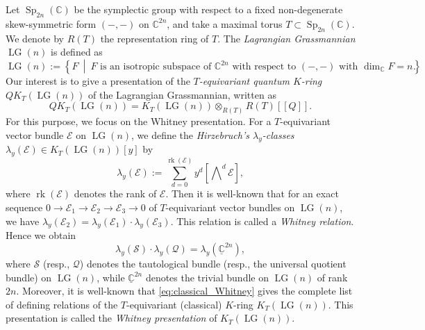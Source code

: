 \documentclass[a4paper, 11pt, reqno]{amsart}
\numberwithin{equation}{section}
\newcommand{\BC}{\mathbb{C}}
\newcommand{\udBC}{\underline{\BC}}
\newcommand{\CE}{\mathcal{E}}
\newcommand{\CQ}{\mathcal{Q}}
\newcommand{\CS}{\mathcal{S}}
\newcommand{\Sp}[1]{\operatorname{Sp}_{#1}(\BC)}
\newcommand{\LG}{\operatorname{LG}}
\newcommand{\bra}[1]{[\![ #1 ]\!]}
\newcommand{\class}[1]{\left[ #1 \right]}
\newcommand{\extprod}{\bigwedge\nolimits}
\DeclareMathOperator{\rk}{rk}
\theoremstyle{plain}
\theoremstyle{definition}
\theoremstyle{remark}
\begin{document}
Let $\Sp{2n}$ be the symplectic group with respect to a fixed non-degenerate skew-symmetric form $(-, -)$ on $\BC^{2n}$, and take a maximal torus $T \subset \Sp{2n}$. 
We denote by $R(T)$ the representation ring of $T$. 
The \emph{Lagrangian Grassmannian} $\LG(n)$ is defined as 
\begin{equation}
\LG(n) := \left\{ F \ \middle| \ \text{$F$ is an isotropic subspace of $\BC^{2n}$ with respect to $(-, -)$ with $\dim_{\BC}F = n$} \right\}. 
\end{equation}
Our interest is to give a presentation of the \emph{$T$-equivariant quantum $K$-ring} $QK_{T}(\LG(n))$ of the Lagrangian Grassmannian, written as 
\begin{equation}
QK_{T}(\LG(n)) = K_{T}(\LG(n)) \otimes_{R(T)} R(T)\bra{Q}. 
\end{equation}
For this purpose, we focus on the Whitney presentation. 
For a $T$-equivariant vector bundle $\CE$ on $\LG(n)$, we define the \emph{Hirzebruch's $\lambda_{y}$-classes} $\lambda_{y}(\CE) \in K_{T}(\LG(n))[y]$ by 
\begin{equation}
\lambda_{y}(\CE) := \sum_{d=0}^{\rk(\CE)} y^{d} \class{\extprod^{d} \CE}, 
\end{equation}
where $\rk(\CE)$ denotes the rank of $\CE$. 
Then it is well-known that for an exact sequence $0 \rightarrow \CE_{1} \rightarrow \CE_{2} \rightarrow \CE_{3} \rightarrow 0$ of $T$-equivariant vector bundles on $\LG(n)$, we have $\lambda_{y}(\CE_{2}) = \lambda_{y}(\CE_{1}) \cdot \lambda_{y}(\CE_{3})$. 
This relation is called a \emph{Whitney relation}. 
Hence we obtain 
\begin{equation} \label{eq:classical_Whitney}
\lambda_{y}(\CS) \cdot \lambda_{y}(\CQ) = \lambda_{y}(\udBC^{2n}),  
\end{equation}
where $\CS$ (resp., $\CQ$) denotes the tautological bundle (resp., the universal quotient bundle) on $\LG(n)$, while $\udBC^{2n}$ denotes the trivial bundle on $\LG(n)$ of rank $2n$. 
Moreover, it is well-known that \eqref{eq:classical_Whitney} gives the complete list of defining relations of the $T$-equivariant (classical) $K$-ring $K_{T}(\LG(n))$. 
This presentation is called the \emph{Whitney presentation} of $K_{T}(\LG(n))$. 
\end{document}
